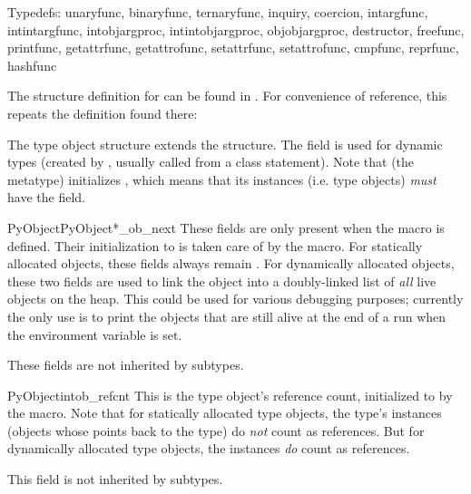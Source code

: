 Typedefs:
unaryfunc, binaryfunc, ternaryfunc, inquiry, coercion, intargfunc,
intintargfunc, intobjargproc, intintobjargproc, objobjargproc,
destructor, freefunc, printfunc, getattrfunc, getattrofunc, setattrfunc,
setattrofunc, cmpfunc, reprfunc, hashfunc

The structure definition for  can be found in
.  For convenience of reference, this repeats
the definition found there:



The type object structure extends the  structure.
The  field is used for dynamic types (created
by  , usually called from a class statement).
Note that  (the metatype) initializes
, which means that its instances (i.e. type
objects) \emph{must} have the  field.

\begin{cmemberdesc}{PyObject}{PyObject*}{_ob_next}
  These fields are only present when the macro  is
  defined.  Their initialization to \NULL{} is taken care of by the
   macro.  For statically allocated objects,
  these fields always remain \NULL.  For dynamically allocated
  objects, these two fields are used to link the object into a
  doubly-linked list of \emph{all} live objects on the heap.  This
  could be used for various debugging purposes; currently the only use
  is to print the objects that are still alive at the end of a run
  when the environment variable  is set.

  These fields are not inherited by subtypes.
\end{cmemberdesc}

\begin{cmemberdesc}{PyObject}{int}{ob_refcnt}
  This is the type object's reference count, initialized to 
  by the  macro.  Note that for statically
  allocated type objects, the type's instances (objects whose
   points back to the type) do \emph{not} count as
  references.  But for dynamically allocated type objects, the
  instances \emph{do} count as references.

  This field is not inherited by subtypes.
\end{cmemberdesc}

